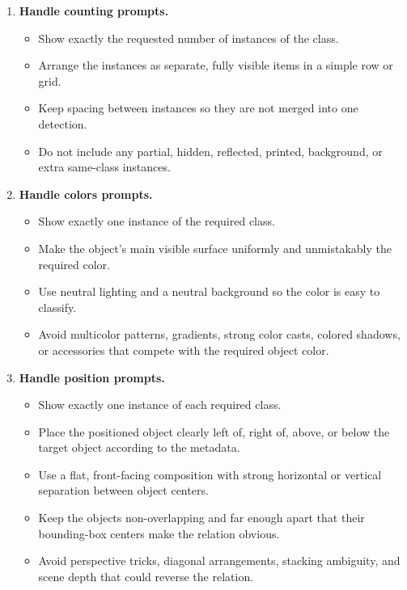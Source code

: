 \begin{tcolorbox}
\begin{enumerate}[leftmargin=1.5em, itemsep=0.2em]
    \item \textbf{Handle counting prompts.}
    \begin{itemize}[leftmargin=1.5em, nosep]
        \item Show exactly the requested number of instances of the class.
        \item Arrange the instances as separate, fully visible items in a simple row or grid.
        \item Keep spacing between instances so they are not merged into one detection.
        \item Do not include any partial, hidden, reflected, printed, background, or extra same-class instances.
    \end{itemize}

    \item \textbf{Handle colors prompts.}
    \begin{itemize}[leftmargin=1.5em, nosep]
        \item Show exactly one instance of the required class.
        \item Make the object's main visible surface uniformly and unmistakably the required color.
        \item Use neutral lighting and a neutral background so the color is easy to classify.
        \item Avoid multicolor patterns, gradients, strong color casts, colored shadows, or accessories that compete with the required object color.
    \end{itemize}

    \item \textbf{Handle position prompts.}
    \begin{itemize}[leftmargin=1.5em, nosep]
        \item Show exactly one instance of each required class.
        \item Place the positioned object clearly left of, right of, above, or below the target object according to the metadata.
        \item Use a flat, front-facing composition with strong horizontal or vertical separation between object centers.
        \item Keep the objects non-overlapping and far enough apart that their bounding-box centers make the relation obvious.
        \item Avoid perspective tricks, diagonal arrangements, stacking ambiguity, and scene depth that could reverse the relation.
    \end{itemize}


\end{enumerate}
\end{tcolorbox}
